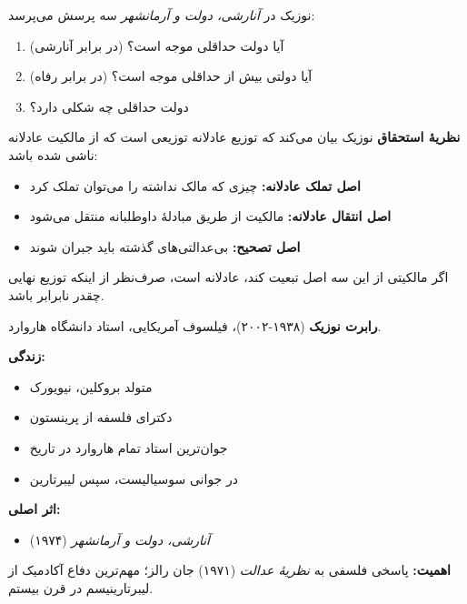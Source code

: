 نوزیک در \textit{آنارشی، دولت و آرمانشهر} سه پرسش می‌پرسد:

\begin{enumerate}[nosep]
	\item آیا دولت حداقلی موجه است؟ (در برابر آنارشی)
	\item آیا دولتی بیش از حداقلی موجه است؟ (در برابر رفاه)
	\item دولت حداقلی چه شکلی دارد؟
\end{enumerate}

\textbf{نظریهٔ استحقاق} نوزیک بیان می‌کند که توزیع عادلانه توزیعی است که از مالکیت عادلانه ناشی شده باشد:

\begin{itemize}[nosep]
	\item \textbf{اصل تملک عادلانه:} چیزی که مالک نداشته را می‌توان تملک کرد
	\item \textbf{اصل انتقال عادلانه:} مالکیت از طریق مبادلهٔ داوطلبانه منتقل می‌شود
	\item \textbf{اصل تصحیح:} بی‌عدالتی‌های گذشته باید جبران شوند
\end{itemize}

اگر مالکیتی از این سه اصل تبعیت کند، عادلانه است، صرف‌نظر از اینکه توزیع نهایی چقدر نابرابر باشد.
\begin{tcolorbox}[
    enhanced,
    colback=gray!5,
    colframe=darkgray,
    boxrule=2pt,
    arc=10pt,
    shadow={2mm}{-2mm}{0mm}{black!30},
    fonttitle=\bfseries\large,
    title={\rl{👤 پرترهٔ متفکر: رابرت نوزیک}}
]

\textbf{رابرت نوزیک} (۱۹۳۸-۲۰۰۲)، فیلسوف آمریکایی، استاد دانشگاه هاروارد.

\textbf{زندگی:}
\begin{itemize}
    \item متولد بروکلین، نیویورک
    \item دکترای فلسفه از پرینستون
    \item جوان‌ترین استاد تمام هاروارد در تاریخ
    \item در جوانی سوسیالیست، سپس لیبرتارین
\end{itemize}



\textbf{اثر اصلی:}
\begin{itemize}
    \item \textit{آنارشی، دولت و آرمانشهر} (۱۹۷۴)
\end{itemize}

\textbf{اهمیت:}
پاسخی فلسفی به \textit{نظریهٔ عدالت} (۱۹۷۱) جان رالز؛ مهم‌ترین دفاع آکادمیک از لیبرتارینیسم در قرن بیستم.
\end{tcolorbox}

